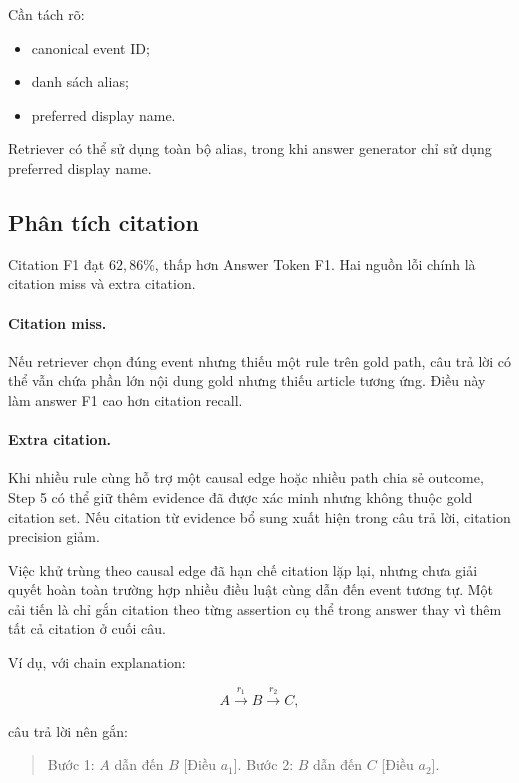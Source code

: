 Cần tách rõ:

\begin{itemize}
    \item canonical event ID;
    \item danh sách alias;
    \item preferred display name.
\end{itemize}

Retriever có thể sử dụng toàn bộ alias, trong khi answer generator chỉ sử
dụng preferred display name.

\subsection{Phân tích citation}

Citation F1 đạt \(62{,}86\%\), thấp hơn Answer Token F1. Hai nguồn lỗi chính
là citation miss và extra citation.

\paragraph{Citation miss.}

Nếu retriever chọn đúng event nhưng thiếu một rule trên gold path, câu trả
lời có thể vẫn chứa phần lớn nội dung gold nhưng thiếu article tương ứng.
Điều này làm answer F1 cao hơn citation recall.

\paragraph{Extra citation.}

Khi nhiều rule cùng hỗ trợ một causal edge hoặc nhiều path chia sẻ outcome,
Step 5 có thể giữ thêm evidence đã được xác minh nhưng không thuộc gold
citation set. Nếu citation từ evidence bổ sung xuất hiện trong câu trả lời,
citation precision giảm.

Việc khử trùng theo causal edge đã hạn chế citation lặp lại, nhưng chưa giải
quyết hoàn toàn trường hợp nhiều điều luật cùng dẫn đến event tương tự. Một
cải tiến là chỉ gắn citation theo từng assertion cụ thể trong answer thay vì
thêm tất cả citation ở cuối câu.

Ví dụ, với chain explanation:

\[
A \xrightarrow{r_1} B \xrightarrow{r_2} C,
\]

câu trả lời nên gắn:

\begin{quote}
Bước 1: \(A\) dẫn đến \(B\) [Điều \(a_1\)].
Bước 2: \(B\) dẫn đến \(C\) [Điều \(a_2\)].
\end{quote}

